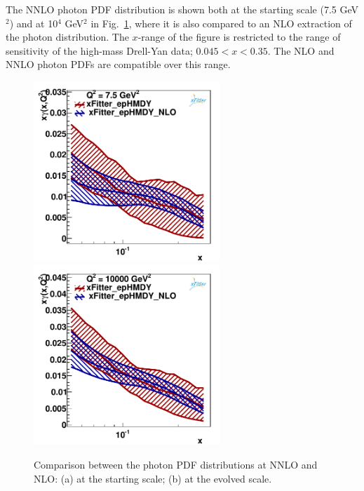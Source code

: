 The NNLO photon PDF distribution is shown 
both at the starting scale (7.5 GeV$^{2}$) and at 10$^{4}$ GeV$^{2}$ 
 in Fig.~\ref{photon}, where it is also compared to an NLO extraction of the photon distribution.
The $x$-range of the figure is restricted to the range of sensitivity of the high-mass Drell-Yan data;
$0.045 < x < 0.35$. The NLO and NNLO photon PDFs are compatible over this range.
\begin{figure}
\includegraphics[width=7cm]{plots/photon_7_5.pdf} 
\includegraphics[width=7cm]{plots/photon_10000.pdf} 
\caption{Comparison between the photon PDF distributions at NNLO and NLO: (a) at the starting scale; (b) at the evolved scale.}
\label{photon}
\end{figure}


